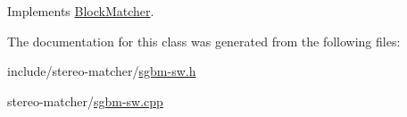 Implements \hyperlink{classBlockMatcher_af80a89fda1b2fd2d78e75e7466dcbcca}{Block\+Matcher}.



The documentation for this class was generated from the following files\+:\begin{DoxyCompactItemize}
\item 
include/stereo-\/matcher/\hyperlink{sgbm-sw_8h}{sgbm-\/sw.\+h}\item 
stereo-\/matcher/\hyperlink{sgbm-sw_8cpp}{sgbm-\/sw.\+cpp}\end{DoxyCompactItemize}

